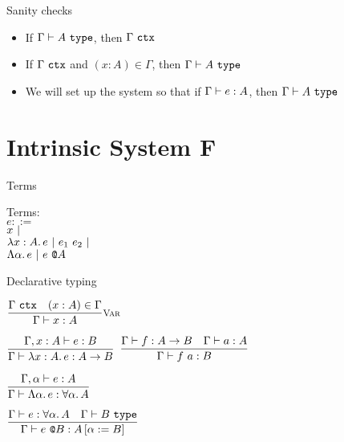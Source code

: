 \documentclass{beamer}
\begin{document}
\begin{frame}{Sanity checks}

\begin{itemize}
  \item If $\type{A}$, then $\Gamma\ \texttt{ctx}$
  \item If $\Gamma\ \texttt{ctx}$ and $(x : A) \in \Gamma$, then $\type{A}$
  \item We will set up the system so that if $\typing{e}{A}$, then $\type{A}$
\end{itemize}

\end{frame}

\section{Intrinsic System F}

\begin{frame}{Terms}

Terms: \\
$e ::=$ \\
\qquad $x \ |\  $ \\
\qquad $\fun{x}[A]{e} \pipe \app{e_1}{e_2} \pipe$ \\
\qquad $\Lambda \alpha.\, e \ |\  e\ \texttt{@}A$

\end{frame}

\begin{frame}{Declarative typing}

\begin{center}
  $\infrule[Var]{\ctx{\Gamma} \quad \sidecond{(x : A) \in \Gamma}}{\typing{x}{A}}$

  \vspace{2em}

  $\infrule{\typing[\extend{\Gamma}{x}{A}]{e}{B}}{\typing{\fun{x}[A]{e}}{\Fun{A}{B}}}$ \quad
  $\infrule{\typing{f}{\Fun{A}{B}} \quad \typing{a}{A}}{\typing{\app{f}{a}}{B}}$

  \vspace{2em}

  $\infrule{\typing[\extendtype{\Gamma}{\alpha}]{e}{A}}{\typing{\tfun{\alpha}{e}}{\ForallT{\alpha}{A}}}$

  \vspace{2em}

  $\infrule{\typing{e}{\ForallT{\alpha}{A}} \quad \type{B}}{\typing{\tapp{e}{B}}{\subst{A}{\alpha}{B}}}$
\end{center}

\end{frame}
\end{document}
